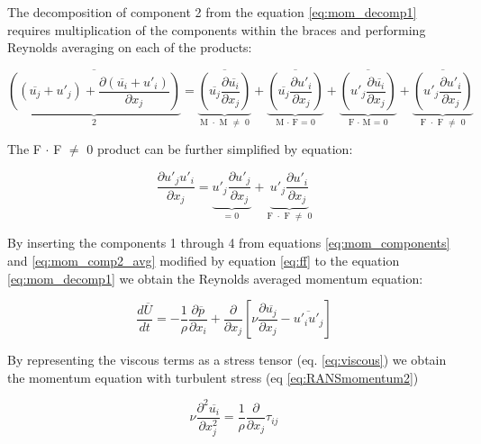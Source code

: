 The decomposition of component 2 from the equation \ref{eq:mom_decomp1} requires multiplication of the components within the braces and performing Reynolds averaging on each of the products: 

\begin{equation} \label{eq:mom_comp2_avg}
\underbrace{\overline {\left( \left( \overline{u_j} + u'_j \right) + \frac{\partial \left( \overline{u_i} + u'_i \right)}{\partial x_j} \right)}}_\text{2}
= \underbrace{\overline{\left( \overline{u_j} \frac{\partial \overline{u_i}}{\partial x_j} \right)}}_\text{M $\cdot$ M $\neq$ 0}
+ \underbrace{\overline{\left( \overline{u_j} \frac{\partial u'_i}{\partial x_j} \right)}}_\text{M $\cdot$ F = 0}
+ \underbrace{\overline{\left( u'_j \frac{\partial \overline{u_i}}{\partial x_j} \right)}}_\text{F $\cdot$ M = 0}
+ \underbrace{\overline{\left( u'_j \frac{\partial u'_i}{\partial x_j} \right)}}_\text{F $\cdot$ F $\neq$ 0}
\end{equation}

The F $\cdot$ F $\neq$ 0 product can be further simplified by equation:

\begin{equation} \label{eq:ff}
\frac{\partial u'_j u'_i}{\partial x_j}
= \underbrace{u'_j \frac{\partial u'_j}{\partial x_j}}_\text{= 0}
+ \underbrace{u'_j \frac{\partial u'_i}{\partial x_j}}_\text{F $\cdot$ F $\neq$ 0}
\end{equation}

By inserting the components 1 through 4 from equations \ref{eq:mom_components} and \ref{eq:mom_comp2_avg} modified by equation \ref{eq:ff} to the equation \ref{eq:mom_decomp1} we obtain the Reynolds averaged momentum equation:

\begin{equation} \label{eq:RANSmomentum}
\frac{d \overline{U}}{dt}
=
- \frac{1}{\rho} \frac{\partial \overline{p}}{\partial x_i}
+ \frac{\partial}{\partial x_j} \left[ \nu \frac{\partial \overline{u_j}}{\partial x_j} - \overline{u'_i u'_j}\right]
\end{equation}

By representing the viscous terms as a stress tensor (eq. \ref{eq:viscous}) we obtain the momentum equation with turbulent stress (eq \ref{eq:RANSmomentum2})

\begin{equation} \label{eq:viscous}
\nu \frac{\partial^2 \overline{u_i}}{\partial x_j^2}
=
\frac{1}{\rho} \frac{\partial}{\partial x_j} \tau_{ij}
\end{equation}

